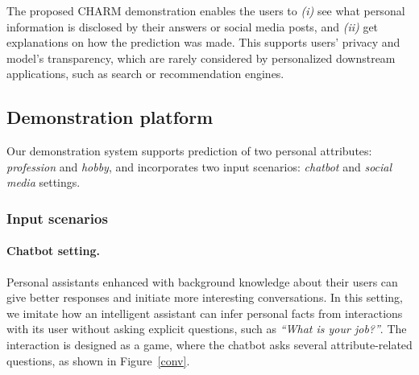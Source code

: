 The proposed CHARM demonstration enables the users to \emph{(i)} see what personal information is disclosed by their answers or social media posts, and \emph{(ii)} get explanations on how the prediction was made. This supports users' privacy and model's transparency, which are rarely considered by personalized downstream applications, such as search or recommendation engines.


\subsection{Demonstration platform}

\label{sec:demo}

Our demonstration system supports prediction of two personal attributes: \textit{profession} and \textit{hobby}, and incorporates two input scenarios: \emph{chatbot} and \emph{social media} settings.

\subsubsection{Input scenarios}

\paragraph{Chatbot setting.} Personal assistants enhanced with background knowledge about their users can give better responses and initiate more interesting conversations.
In this setting, we imitate how an intelligent assistant can infer personal facts from interactions with its user without asking explicit questions, such as \emph{``What is your job?''}. 
The interaction is designed as a game, where the chatbot asks several attribute-related questions, as shown in Figure~\ref{conv}.

